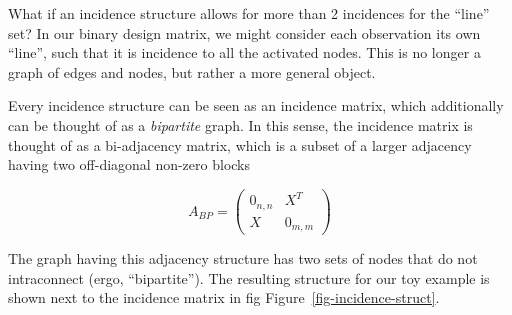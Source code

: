 \documentclass[%
	12pt,
		oneside,
		letterpaper
]{book}
\begin{document}
What if an incidence structure allows for more than 2 incidences for the
``line'' set? In our binary design matrix, we might consider each
observation its own ``line'', such that it is incidence to all the
activated nodes. This is no longer a graph of edges and nodes, but
rather a more general object.

Every incidence structure can be seen as an incidence matrix, which
additionally can be thought of as a \emph{bipartite} graph. In this
sense, the incidence matrix is thought of as a bi-adjacency matrix,
which is a subset of a larger adjacency having two off-diagonal non-zero
blocks

\[
A_{BP} = 
\begin{pmatrix}
0_{n,n} & X^T \\
X & 0_{m,m}
\end{pmatrix}
\]

The graph having this adjacency structure has two sets of nodes that do
not intraconnect (ergo, ``bipartite''). The resulting structure for our
toy example is shown next to the incidence matrix in fig
Figure~\ref{fig-incidence-struct}.
\end{document}
